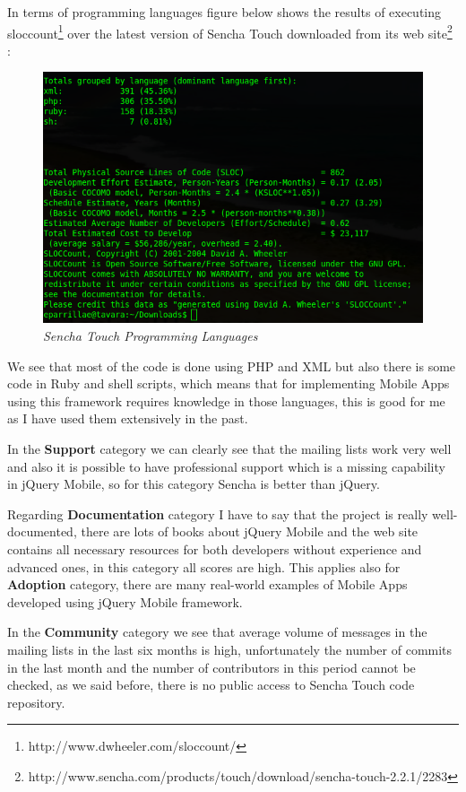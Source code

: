 \documentclass[a4paper,12pt]{book}
\begin{document}
In terms of programming languages figure below shows the results of executing sloccount\footnote{http://www.dwheeler.com/sloccount/} over the latest version of Sencha Touch downloaded from its web site\footnote{http://www.sencha.com/products/touch/download/sencha-touch-2.2.1/2283} :

\begin{figure}[H]
    \centering
    \includegraphics[width=15cm, keepaspectratio]{img/senchasloccount.png}
    \caption{\textit{Sencha Touch Programming Languages}}
    \label{figure:jquerylanguages}
 \end{figure}

We see that most of the code is done using PHP and XML but also there is some code in Ruby and shell scripts, which means that for implementing Mobile Apps using this framework requires knowledge in those languages, this is good for me as I have used them extensively in the past.

In the \textbf{Support} category we can clearly see that the mailing lists work very well and also it is possible to have professional support\cite{sencha support}  which is a missing capability in jQuery Mobile, so for this category Sencha is better than jQuery.

Regarding \textbf{Documentation} category I have to say that the project is really well-documented, there are lots of books about jQuery Mobile and the web site contains all necessary resources for both developers without experience and advanced ones, in this category all scores are high. This applies also for \textbf{Adoption} category, there are many real-world examples of Mobile Apps developed using jQuery Mobile framework.

In the \textbf{Community} category we see that average volume of messages in the mailing lists in the last six months is high, unfortunately the number of commits in the last month and the number of contributors in this period cannot be checked, as we said before, there is no public access to Sencha Touch code repository. 
\end{document}
